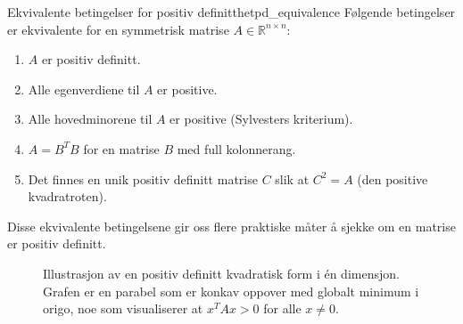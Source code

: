 \begin{theorem}{Ekvivalente betingelser for positiv definitthet}{pd_equivalence}
	Følgende betingelser er ekvivalente for en symmetrisk matrise $A \in \mathbb{R}^{n \times n}$:
	\begin{enumerate}
		\item $A$ er positiv definitt.
		\item Alle egenverdiene til $A$ er positive.
		\item Alle hovedminorene til $A$ er positive (Sylvesters kriterium).
		\item $A = B^T B$ for en matrise $B$ med full kolonnerang.
		\item Det finnes en unik positiv definitt matrise $C$ slik at $C^2 = A$ (den positive kvadratroten).
	\end{enumerate}
\end{theorem}

Disse ekvivalente betingelsene gir oss flere praktiske måter å sjekke om en matrise er positiv definitt.

\begin{figure}[H]
	\centering
	\caption{Illustrasjon av en positiv definitt kvadratisk form i én dimensjon. Grafen er en parabel som er konkav oppover med globalt minimum i origo, noe som visualiserer at $x^T A x > 0$ for alle $x \neq 0$.}
	\label{fig:positive_definite}
\end{figure}

